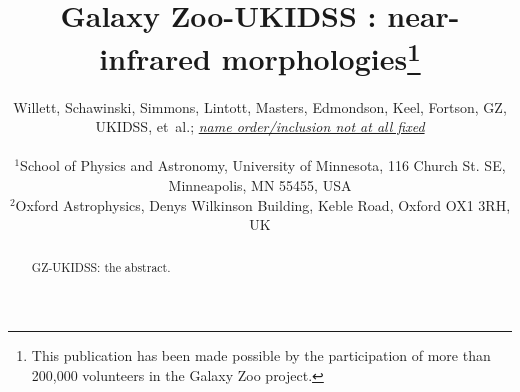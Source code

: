 \documentclass[useAMS,usenatbib]{mn2e}
\begin{document}
\title[Galaxy Zoo-UKIDSS : near-infrared morphologies for galaxies in the local Universe]{Galaxy Zoo-UKIDSS : near-infrared morphologies\thanks{This publication has been made possible by the participation of more than 200,000 volunteers in the Galaxy Zoo project.} } \author[Willett et al.]{\parbox[t]{16cm}{Willett, Schawinski, Simmons, Lintott, Masters, Edmondson, Keel, Fortson, GZ, UKIDSS, et~al.; \underline{{\it name order/inclusion not at all fixed}}
\vspace{0.1in} }\\
$^{1}$School of Physics and Astronomy, University of Minnesota, 116 Church St. SE, Minneapolis, MN 55455, USA\\
$^{2}$Oxford Astrophysics, Denys Wilkinson Building, Keble Road, Oxford OX1 3RH, UK\\
   }
  
\maketitle
  
\label{firstpage}
  
\begin{abstract}

GZ-UKIDSS: the abstract. 

\end{abstract}
  
\end{document}
